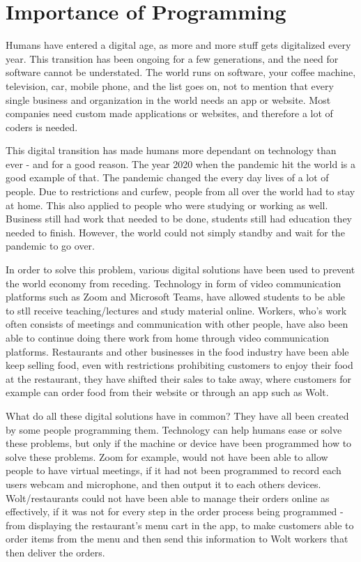 \chapter{Importance of Programming} \label{chap:importance_of_programming}

Humans have entered a digital age, as more and more stuff gets 
digitalized every year. This transition has been ongoing for a few 
generations, and the need for software cannot be understated. The 
world runs on software, your coffee machine, television, car, mobile
phone, and the list goes on, not to mention that every single business 
and organization in the world needs an app or website. Most companies
need custom made applications or websites, and therefore a lot of coders
is needed.

This digital transition has made humans more dependant on technology than ever - 
and for a good reason. The year 2020 when the pandemic hit the world is a good example of that.
The pandemic changed the every day lives of a lot of people. Due to restrictions and curfew,
people from all over the world had to stay at home. This also applied to people 
who were studying or working as well. Business still had work that needed to be done,
students still had education they needed to finish. However, the world could not simply 
standby and wait for the pandemic to go over. 

In order to solve this problem,
various digital solutions have been used to prevent the world economy from receding.
Technology in form of video communication platforms such as Zoom and Microsoft Teams,
have allowed students to be able to stll receive teaching/lectures and study material online. 
Workers, who's work often consists of meetings and communication with other people,
have also been able to continue doing there work from home through video communication platforms. 
Restaurants and other businesses in the food industry have been able keep selling food, 
even with restrictions prohibiting customers to enjoy their food at the restaurant, 
they have shifted their sales to take away, where customers for example can order
food from their website or through an app such as Wolt. \newline


What do all these digital solutions have in common? They have all been created by 
some people programming them. Technology can help humans ease or solve these problems, 
but only if the machine or device have been programmed how to solve these problems. 
Zoom for example, would not have been able to allow people to have virtual meetings, 
if it had not been programmed to record each users webcam and microphone, and then output
it to each others devices. Wolt/restaurants could not have been able to manage
their orders online as effectively, if it was not for every step in the order process
being programmed - from displaying the restaurant's menu cart in the app, to make customers
able to order items from the menu and then send this information to Wolt workers that then 
deliver the orders. \newline

